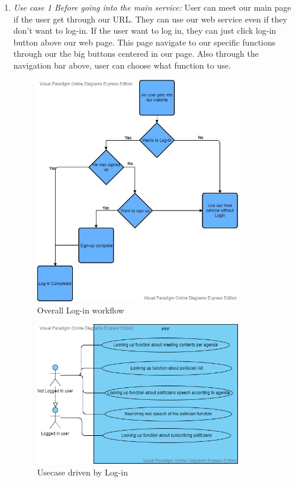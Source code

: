 \documentclass[conference]{IEEEtran}
\begin{document}
\begin{enumerate}

\item \textit {Use case 1 Before going into the main service: } User can meet our main page if the user get through our URL. They can use our web service even if they don’t want to log-in. If the user want to log in, they can just click log-in button above our web page. This page navigate to our specific functions  through our the big buttons centered in our page. Also through the navigation bar above, user can choose what function to use.
 \\
 
  \begin{figure}[htbp]
\centerline{\includegraphics[width=90mm,scale=0.5]{fig/usecase1.jpg}}
\caption{Overall Log-in workflow}
\label{fig}
\end{figure}
 
 \begin{figure}[htbp]
\centerline{\includegraphics[width=90mm,scale=0.5]{fig/usecase2.png}}
\caption{Usecase driven by Log-in}
\label{fig}
\end{figure}


\end{enumerate}
\end{document}
